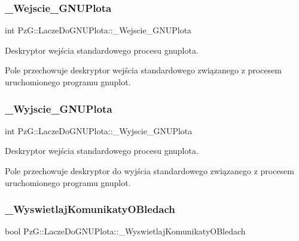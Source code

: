 \subsubsection{\texorpdfstring{\_Wejscie\_GNUPlota}{\_Wejscie\_GNUPlota}}
{\footnotesize\ttfamily int Pz\+G\+::\+Lacze\+Do\+G\+N\+U\+Plota\+::\+\_\+\+Wejscie\+\_\+\+G\+N\+U\+Plota\hspace{0.3cm}{\ttfamily [protected]}}



Deskryptor wejścia standardowego procesu gnuplota. 

Pole przechowuje deskryptor wejścia standardowego związanego z procesem uruchomionego programu gnuplot. \mbox{\label{class_pz_g_1_1_lacze_do_g_n_u_plota_a7d05a4767a35ee494d59724bb740dbc2}} 
\subsubsection{\texorpdfstring{\_Wyjscie\_GNUPlota}{\_Wyjscie\_GNUPlota}}
{\footnotesize\ttfamily int Pz\+G\+::\+Lacze\+Do\+G\+N\+U\+Plota\+::\+\_\+\+Wyjscie\+\_\+\+G\+N\+U\+Plota\hspace{0.3cm}{\ttfamily [protected]}}



Deskryptor wejścia standardowego procesu gnuplota. 

Pole przechowuje deskryptor do wyjścia standardowego związanego z procesem uruchomionego programu gnuplot. \mbox{\label{class_pz_g_1_1_lacze_do_g_n_u_plota_a2f2800f14ebfe1caef0b4d30c410a7fe}} 
\subsubsection{\texorpdfstring{\_WyswietlajKomunikatyOBledach}{\_WyswietlajKomunikatyOBledach}}
{\footnotesize\ttfamily bool Pz\+G\+::\+Lacze\+Do\+G\+N\+U\+Plota\+::\+\_\+\+Wyswietlaj\+Komunikaty\+O\+Bledach\hspace{0.3cm}{\ttfamily [protected]}}



